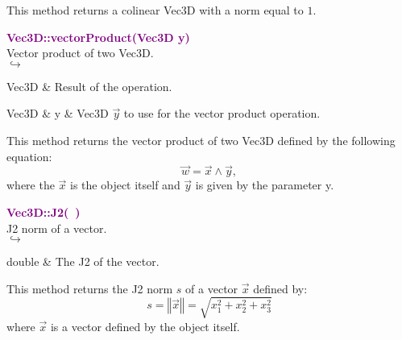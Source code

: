 This method returns a colinear Vec3D with a norm equal to $1$.

\textcolor{purple}{\textbf{Vec3D::vectorProduct(Vec3D y)}}\label{Vec3D::vectorProduct(Vec3D y)}\\
Vector product of two Vec3D.\\ \hspace*{5mm}$\hookrightarrow$
\vspace*{-2em}\begin{tcolorbox}[grow to left by=-1cm, width=\textwidth-1cm,myArgs,tabularx={l|R}]
Vec3D & Result of the operation.
\end{tcolorbox}

\begin{tcolorbox}[width=\textwidth,myArgs,tabularx={ll|R}]
Vec3D & y & Vec3D $\overrightarrow{y}$ to use for the vector product operation.
\end{tcolorbox}

This method returns the vector product of two Vec3D defined by the following equation:
\begin{equation*}
\overrightarrow{w} = \overrightarrow{x}\land\overrightarrow{y},
\end{equation*}
where the $\overrightarrow{x}$ is the object itself and $\overrightarrow{y}$ is given by the parameter y.

\textcolor{purple}{\textbf{Vec3D::J2(~)}}\label{Vec3D::J2()}\\
J2 norm of a vector.\\ \hspace*{5mm}$\hookrightarrow$
\vspace*{-2em}\begin{tcolorbox}[grow to left by=-1cm, width=\textwidth-1cm,myArgs,tabularx={l|R}]
double & The J2 of the vector.
\end{tcolorbox}

This method returns the J2 norm $s$ of a vector $\overrightarrow{x}$ defined by:
\begin{equation*}
s = \left\Vert \overrightarrow{x} \right\Vert  = \sqrt {x_{1}^2 + x_{2}^2 + x_{3}^2}
\end{equation*}
where $\overrightarrow{x}$ is a vector defined by the object itself.

